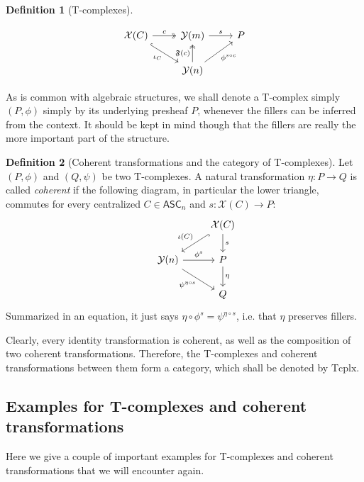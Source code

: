 \documentclass{article}
\theoremstyle{remark}
\theoremstyle{definition}
\newtheorem{definition}{Definition}[subsection]
\newcommand{\ASC}{\mathsf{ASC}}
\newcommand{\Y}{\mathcal Y}
\newcommand{\X}{\mathcal X}
\newcommand{\F}{\mathfrak F}
\newcommand{\Tcplx}{\mathrm{Tcplx}}
\begin{document}
\begin{definition}[T-complexes]
\begin{enumerate}
			\begin{equation}\label{epifac}\begin{tikzcd}
				\X(C)\arrow[two heads]{r}{c}\arrow[hook]{dr}[swap]{\iota_C}&\Y(m)\arrow{r}{s}&P\\
				&\Y(n)\arrow[two heads]{u}{\F(c)}\arrow{ur}[swap]{\phi^{s\circ c}}
			\end{tikzcd}\end{equation}
		\end{enumerate}
		As is common with algebraic structures, we shall denote a T-complex simply $(P,\phi)$ simply by its underlying presheaf $P$, whenever the fillers can be inferred from the context. It should be kept in mind though that the fillers are really the more important part of the structure.
	\end{definition}
	\begin{definition}[Coherent transformations and the category of T-complexes]
		Let $(P,\phi)$ and $(Q,\psi)$ be two T-complexes. A natural transformation $\eta:P\to Q$ is called \textit{coherent} if the following diagram, in particular the lower triangle, commutes for every centralized $C\in\ASC_n$ and $s:\X(C)\to P$:
		\[\begin{tikzcd}
			&&\X(C)\arrow{d}{s}\arrow[hook]{ld}[swap]{\iota(C)}\\
			&\Y(n)\arrow{r}{\phi^s}\arrow{dr}[swap]{\psi^{\eta\circ s}}&P\arrow{d}{\eta}\\
			&&Q
		\end{tikzcd}\]
		Summarized in an equation, it just says $\eta\circ\phi^s=\psi^{\eta\circ s}$, i.e. that $\eta$ preserves fillers.
		
		Clearly, every identity transformation is coherent, as well as the composition of two coherent transformations. Therefore, the T-complexes and coherent transformations between them form a category, which shall be denoted by $\Tcplx$.
	\end{definition}
	\subsection{Examples for T-complexes and coherent transformations}
	Here we give a couple of important examples for T-complexes and coherent transformations that we will encounter again.
	
\end{document}
